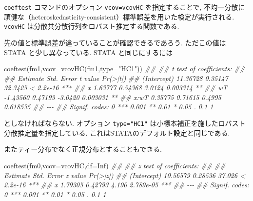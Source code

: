 \documentclass[
  letterpaper,
  xelatex,
  ja=standard, xelatex]{bxjsbook}
\newenvironment{Shaded}{\begin{snugshade}}{\end{snugshade}}
\newcommand{\AttributeTok}[1]{\textcolor[rgb]{0.40,0.45,0.13}{#1}}
\newcommand{\ConstantTok}[1]{\textcolor[rgb]{0.56,0.35,0.01}{#1}}
\newcommand{\DocumentationTok}[1]{\textcolor[rgb]{0.37,0.37,0.37}{\textit{#1}}}
\newcommand{\FunctionTok}[1]{\textcolor[rgb]{0.28,0.35,0.67}{#1}}
\newcommand{\NormalTok}[1]{\textcolor[rgb]{0.00,0.23,0.31}{#1}}
\newcommand{\StringTok}[1]{\textcolor[rgb]{0.13,0.47,0.30}{#1}}
\begin{document}
\texttt{coeftest} コマンドのオプション \texttt{vcov=vcovHC}
を指定することで,
不均一分散に頑健な（heteroskedasticity-consistent）標準誤差を用いた検定が実行される.
\texttt{vcovHC} は分散共分散行列をロバスト推定する関数である.

先の値と標準誤差が違っていることが確認できるであろう. ただこの値は STATA
と少し異なっている. STATA と同じにするには

\begin{Shaded}
\begin{Highlighting}[]
\FunctionTok{coeftest}\NormalTok{(fm1,}\AttributeTok{vcov=}\FunctionTok{vcovHC}\NormalTok{(fm1,}\AttributeTok{type=}\StringTok{"HC1"}\NormalTok{))}
\DocumentationTok{\#\# }
\DocumentationTok{\#\# t test of coefficients:}
\DocumentationTok{\#\# }
\DocumentationTok{\#\#             Estimate Std. Error t value  Pr(\textgreater{}|t|)    }
\DocumentationTok{\#\# (Intercept) 11.36728    0.35147 32.3425 \textless{} 2.2e{-}16 ***}
\DocumentationTok{\#\# x            1.63777    0.54368  3.0124  0.003314 ** }
\DocumentationTok{\#\# wT          {-}1.43560    0.47193 {-}3.0420  0.003031 ** }
\DocumentationTok{\#\# x:wT         0.35775    0.71615  0.4995  0.618535    }
\DocumentationTok{\#\# {-}{-}{-}}
\DocumentationTok{\#\# Signif. codes:  0 \textquotesingle{}***\textquotesingle{} 0.001 \textquotesingle{}**\textquotesingle{} 0.01 \textquotesingle{}*\textquotesingle{} 0.05 \textquotesingle{}.\textquotesingle{} 0.1 \textquotesingle{} \textquotesingle{} 1}
\end{Highlighting}
\end{Shaded}

としなければならない. オプション \texttt{type="HC1"}
は小標本補正を施したロバスト分散推定量を指定している.
これはSTATAのデフォルト設定と同じである.

またティー分布でなく正規分布とすることもできる.

\begin{Shaded}
\begin{Highlighting}[]
\FunctionTok{coeftest}\NormalTok{(fm0,}\AttributeTok{vcov=}\NormalTok{vcovHC,}\AttributeTok{df=}\ConstantTok{Inf}\NormalTok{)}
\DocumentationTok{\#\# }
\DocumentationTok{\#\# z test of coefficients:}
\DocumentationTok{\#\# }
\DocumentationTok{\#\#             Estimate Std. Error z value  Pr(\textgreater{}|z|)    }
\DocumentationTok{\#\# (Intercept) 10.56579    0.28536  37.026 \textless{} 2.2e{-}16 ***}
\DocumentationTok{\#\# x            1.79305    0.42793   4.190 2.789e{-}05 ***}
\DocumentationTok{\#\# {-}{-}{-}}
\DocumentationTok{\#\# Signif. codes:  0 \textquotesingle{}***\textquotesingle{} 0.001 \textquotesingle{}**\textquotesingle{} 0.01 \textquotesingle{}*\textquotesingle{} 0.05 \textquotesingle{}.\textquotesingle{} 0.1 \textquotesingle{} \textquotesingle{} 1}
\end{Highlighting}
\end{Shaded}
\end{document}

